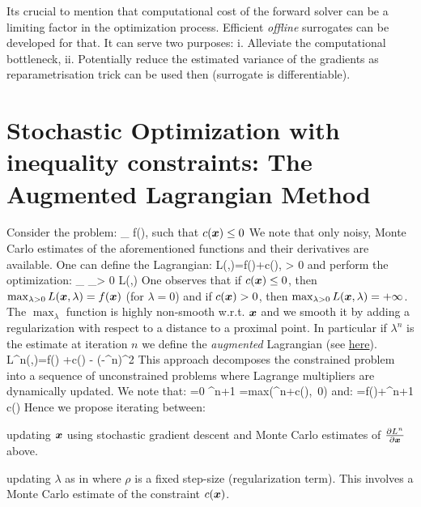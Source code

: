 \documentclass[a4paper,11pt]{article}
\begin{document}
 Its crucial to mention that computational cost of the forward solver can be a limiting factor in the optimization process. Efficient \textit{offline} surrogates can be developed for that. It can serve two purposes: i. Alleviate the computational bottleneck, ii. Potentially reduce the estimated variance of the gradients as reparametrisation trick can be used then (surrogate is differentiable). 

\clearpage
\appendix

\section{Stochastic Optimization with inequality constraints: The Augmented Lagrangian Method}\label{appendix : Augmented Lagrangian}
Consider the problem:
\be
\min_{} f(), \qquad \textrm{ such that $c(\bs{x})\le 0$ }
\ee
 We note that only noisy, Monte Carlo estimates of the aforementioned functions and their derivatives are available.
 One can define the Lagrangian:
 \be
 L(,\lambda)=f()+\lambda c(), \qquad \lambda> 0
 \ee
 and perform the optimization:
 \be
 \min_{} \max_{\lambda > 0} L(,\lambda)
 \ee
 One observes that if $c(\boldsymbol{x})\le 0$, then $\max_{\lambda>0} L(\boldsymbol{x},\lambda)=f(\boldsymbol{x})$ (for $\lambda=0$) and if $c(\boldsymbol{x})>0$, then $\max_{\lambda>0} L(\boldsymbol{x},\lambda)=+\infty$.
 The $\max_{\lambda}$ function is highly non-smooth w.r.t. $\boldsymbol{x}$ and we smooth it by adding a regularization with respect to a distance to a proximal point. In particular if $\lambda^n$ is the estimate at iteration $n$ we define the {\em augmented}  Lagrangian (see \href{https://www.him.uni-bonn.de/fileadmin/him/Section6_HIM_v1.pdf}{here}).
%
\be
L^n(\bx,\lambda)=f(\bx) +\lambda c(\bx) - (\lambda-\lambda^n)^2
\ee
 This approach decomposes the constrained
problem into a sequence of unconstrained problems where Lagrange multipliers   are dynamically updated.
We note that:
\be
{}=0 \to \lambda^{n+1} =max(\lambda^n+\rho c(\bx),~0)
\label{eq:updatel}
\ee
and:
\be
{}=\nabla f(\bx)+\lambda^{n+1} \nabla c(\bx)
\ee
Hence we propose iterating between:
\bi
\item updating $\boldsymbol{x}$ using stochastic gradient descent and Monte Carlo estimates of $\frac{\partial L^n}{\partial \boldsymbol{x}}$ above.
\item updating $\lambda$ as in  where $\rho$  is a fixed step-size (regularization term). This involves a Monte Carlo estimate of the constraint $c(\boldsymbol{x})$.
\ei

\newpage
\nocite{*}

%
\footnotesize{}
\end{document}
